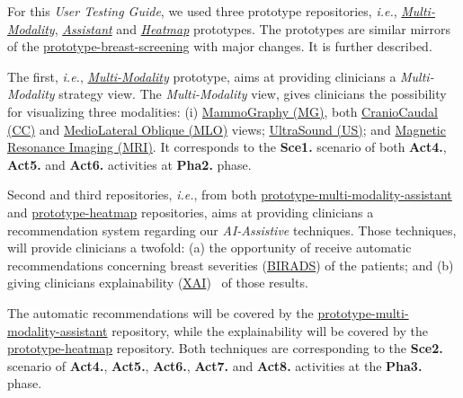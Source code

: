 For this {\it User Testing Guide}, we used three prototype repositories, \textit{i.e.}, \textit{\hyperlink{https://github.com/MIMBCD-UI/prototype-multi-modality}{Multi-Modality}}, \textit{\hyperlink{https://github.com/mida-project/prototype-multi-modality-assistant}{Assistant}} and \textit{\hyperlink{https://github.com/mida-project/prototype-heatmap}{Heatmap}} prototypes. The prototypes are similar mirrors of the \hyperlink{https://github.com/MIMBCD-UI/prototype-breast-screening}{prototype-breast-screening} with major changes. It is further described.

The first, \textit{i.e.}, {\it \hyperlink{https://github.com/MIMBCD-UI/prototype-multi-modality}{Multi-Modality}} prototype, aims at providing clinicians a \textit{Multi-Modality} strategy view. The \textit{Multi-Modality} view, gives clinicians the possibility for visualizing three modalities: (i) \hyperlink{https://medical-dictionary.thefreedictionary.com/mammography}{MammoGraphy (MG)}, both \hyperlink{https://medical-dictionary.thefreedictionary.com/craniocaudal}{CranioCaudal (CC)} and \hyperlink{https://www.thefreedictionary.com/mediolateral}{MedioLateral Oblique (MLO)} views; \hyperlink{https://www.thefreedictionary.com/UltraSound}{UltraSound (US)}; and \hyperlink{https://www.thefreedictionary.com/Magnetic+Resonance+Imaging}{Magnetic Resonance Imaging (MRI)}. It corresponds to the \textbf{Sce1.} scenario of both \textbf{Act4.}, \textbf{Act5.} and \textbf{Act6.} activities at \textbf{Pha2.} phase.

Second and third repositories, \textit{i.e.}, from both \hyperlink{https://github.com/mida-project/prototype-multi-modality-assistant}{prototype-multi-modality-assistant} and \hyperlink{https://github.com/mida-project/prototype-heatmap}{prototype-heatmap} repositories, aims at providing clinicians a recommendation system regarding our \textit{AI-Assistive} techniques. Those techniques, will provide clinicians a twofold: (a) the opportunity of receive automatic recommendations concerning breast severities (\hyperlink{https://en.wikipedia.org/wiki/BI-RADS}{BIRADS}) of the patients; and (b) giving clinicians explainability (\hyperlink{https://www.darpa.mil/program/explainable-artificial-intelligence}{XAI})~\cite{gunning2017explainable, holzinger2017we} of those results.

The automatic recommendations will be covered by the \hyperlink{https://github.com/mida-project/prototype-multi-modality-assistant}{prototype-multi-modality-assistant} repository, while the explainability will be covered by the \hyperlink{https://github.com/mida-project/prototype-heatmap}{prototype-heatmap} repository. Both techniques are corresponding to the \textbf{Sce2.} scenario of \textbf{Act4.}, \textbf{Act5.}, \textbf{Act6.}, \textbf{Act7.} and \textbf{Act8.} activities at the \textbf{Pha3.} phase.